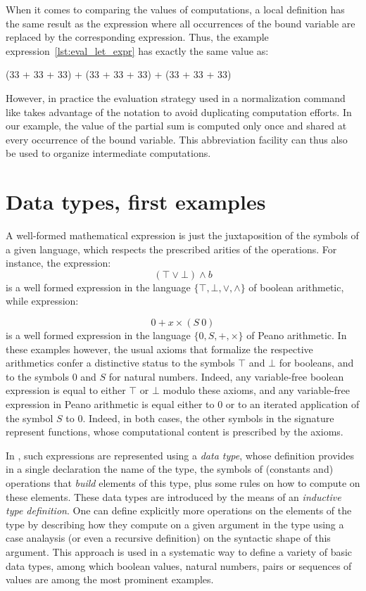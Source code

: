 When it comes to comparing the values of computations, a local definition
has the same result as the expression where all occurrences of the bound
variable are replaced by the corresponding expression.  Thus, the example
expression~\ref{lst:eval_let_expr} has exactly the same value as:

\begin{coq}{}{}
(33 + 33 + 33) + (33 + 33 + 33) + (33 + 33 + 33)
\end{coq}

However, in practice the evaluation strategy used in a normalization
command like  takes advantage of the
  notation to
avoid duplicating computation efforts. In our example, the value of
the partial sum  is computed only once and shared at
every occurrence of the bound variable. This abbreviation facility can
thus also be used to organize intermediate computations.

\section{Data types, first examples}

A well-formed mathematical expression is just the juxtaposition of the
symbols of a given language, which respects the prescribed arities of
the operations. For instance, the expression:
\[(\top \vee \bot) \wedge b\]
is a well formed expression in the language $\{\top, \bot,\vee,\wedge\}$ of
boolean arithmetic, while expression:

\[ 0 + x \times (S\ 0) \]
is a well formed expression in the language $\{0,S, +, \times\}$ of
Peano arithmetic. In these examples however, the usual axioms that
formalize the respective arithmetics confer a distinctive status to
the symbols $\top$ and $\bot$ for booleans, and to the symbols $0$ and
$S$ for natural numbers. Indeed, any variable-free boolean expression
is equal to either $\top$ or $\bot$ modulo these axioms, and any
variable-free expression in Peano arithmetic is equal either to $0$ or
to an iterated application of the symbol $S$ to $0$. Indeed, in both
cases, the other symbols in the signature represent functions, whose
computational content is prescribed by the axioms.

In \Coq{}, such expressions are represented using a \emph{data type},
whose definition provides in a single declaration the name of the
type, the symbols of (constants and) operations that \emph{build}
elements of this type, plus some rules on how to compute on these
elements. These data types are introduced by the means of an
\emph{inductive type definition}.
One can define explicitly more operations on the elements of
the type by describing how they compute on a given argument in the
type using a case analaysis (or even a recursive definition) on the
syntactic shape of this argument.
This approach is used in a systematic way to define a variety of basic
data types, among which boolean values, natural numbers, pairs or
sequences of values are among the most prominent examples.

